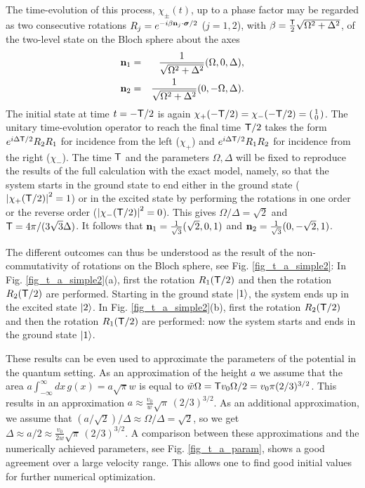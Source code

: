 The time-evolution of this process, $\chi_\pm (t)$,
up to a phase factor may be regarded as
two consecutive rotations $R_j=e^{-i{\beta}{\bf n}_j\cdot {\boldsymbol{\sigma}}/2}$ ($j=1,2$), with $\beta=\frac{{\sf T}}{2}\sqrt{\Omega^2+\Delta^2}$, of the two-level state on the Bloch sphere about the axes
%
\begin{eqnarray}
	{\bf n}_1&=&\frac{1}{\sqrt{\Omega^2+\Delta^2}}(\Omega,0,\Delta), %
	\\
	{\bf n}_2&=&\frac{1}{\sqrt{\Omega^2+\Delta^2}}(0,-\Omega,\Delta). %
\end{eqnarray}
%
The initial state at time $t=-{\sf T}/2$ is again $\chi_+ (-{\sf T}/2) = \chi_- (-{\sf T}/2) =\left(\begin{smallmatrix} 1\\ 0\end{smallmatrix}\right)$.
The unitary time-evolution operator to reach the final time ${\sf T}/2$ takes the form
$e^{i\Delta {\sf T}/2}R_2 R_1$ for  incidence from the left ($\chi_+$) and
$e^{i\Delta {\sf T}/2}R_1 R_2$ for incidence from the right ($\chi_-$).
The time ${\sf T}$ and the parameters $\Omega, \Delta$ will be fixed to reproduce the results of the full calculation with the exact model, namely,
so that the system starts in the ground state to end either in the ground state
($\left| \chi_{+} ({\sf T}/2) \right|^2 = 1$)
or in the excited state by performing the rotations in one order or the reverse order
($\left| \chi_{-} ({\sf T}/2) \right|^2 = 0$). This gives $\Omega/\Delta = \sqrt{2}$ and ${\sf T}= 4\pi/(3 \sqrt{3} \Delta)$. It follows that ${\bf n}_1=\frac{1}{\sqrt{3}}(\sqrt{2},0,1)$ and ${\bf n}_2=\frac{1}{\sqrt{3}}(0,-\sqrt{2},1)$.

The different outcomes can thus be understood as the result of the non-commutativity of rotations on the Bloch sphere, see
Fig. \ref{fig_t_a_simple2}: In Fig. \ref{fig_t_a_simple2}(a), first the rotation $R_1({\sf T}/2)$ and then the rotation $R_2({\sf T}/2)$ are performed. Starting in the ground state $\ket{1}$, the system ends up  in the excited state $\ket{2}$.
In Fig. \ref{fig_t_a_simple2}(b),  first the rotation $R_2({\sf T}/2)$ and then the rotation $R_1({\sf T}/2)$ are performed:  now the system starts and ends  in the ground state $\ket{1}$.

These results can be even used to approximate the parameters of the potential in the quantum setting.
As an approximation of the height $a$ we assume that the area $a \int_{-\infty}^\infty dx \, g(x) = a \sqrt{\pi} w$
is equal to $\tilde w \Omega = {{\sf T}} v_0 \Omega/2 =
v_0 \pi ({2}/{3})^{3/2}$. This results in an
approximation $a \approx \frac{v_0}{w} \sqrt{\pi}\, ({2}/{3})^{3/2}$. As an additional approximation, we
assume that $(a/\sqrt{2})/\Delta \approx {\Omega}/{\Delta} = \sqrt{2}$, so we get
$\Delta \approx a/2 \approx \frac{v_0}{2 w} \sqrt{\pi}\, ({2}/{3})^{3/2}$. A comparison between
these approximations and the numerically achieved parameters, see Fig. \ref{fig_t_a_param}, shows a good agreement
over a large velocity range. This allows one to find good initial values for further numerical optimization.


